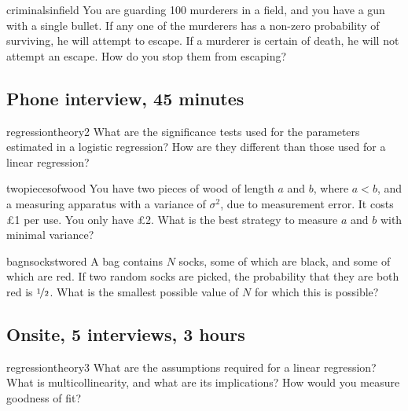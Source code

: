 \documentclass[a4paper]{article}
\begin{document}
\begin{question}{criminalsinfield}
You are guarding 100 murderers in a field, and you have a gun with a single bullet.
If any one of the murderers has a non-zero probability of surviving, he will attempt to escape. If a murderer is certain of death, he will not attempt an escape.
How do you stop them from escaping?
\end{question}

\clearpage





\clearpage
\subsection{Phone interview, 45 minutes}
\begin{question}{regressiontheory2}
What are the significance tests used for the parameters estimated in a logistic regression?
How are they different than those used for a linear regression?
\end{question}


\begin{question}{twopiecesofwood}
You have two pieces of wood of length $a$ and $b$, where $a<b$, and a measuring apparatus with a variance of $\sigma^2$, due to measurement error.
It costs \pounds 1 per use.
You only have \pounds2.
What is the best strategy to measure $a$ and $b$ with minimal variance?
\end{question}



\begin{question}{bagnsockstwored}
A bag contains $N$ socks, some of which are black, and some of which are red.
If two random socks are picked, the probability that they are both red is $\nicefrac{1}{2}$.
What is the smallest possible value of $N$ for which this is possible?
\end{question}

\clearpage





\clearpage
\subsection{Onsite, 5 interviews, 3 hours}
\begin{question}{regressiontheory3}
What are the assumptions required for a linear regression?
What is multicollinearity, and what are its implications?
How would you measure goodness of fit?
\end{question}
\end{document}
